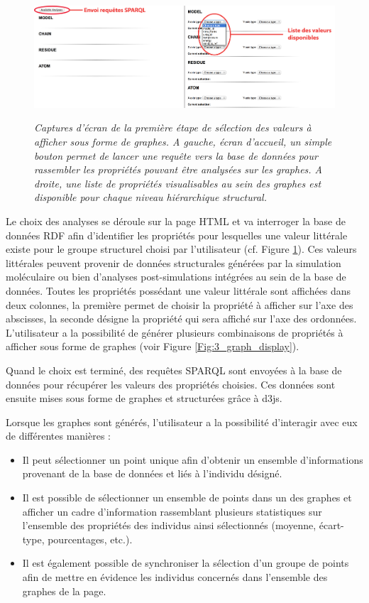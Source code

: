 \begin{figure}[htb]
  \centering
  {\includegraphics[width=0.9\linewidth,frame]{./figures/ch5/1st_step_annot_sep}}
    \caption[Première étape d'utilisation de notre plateforme.]{{\it Captures d'écran de la première étape de sélection des valeurs à afficher sous forme de graphes. A gauche, écran d'accueil, un simple bouton permet de lancer une requête vers la base de données pour rassembler les propriétés pouvant être analysées sur les graphes. A droite, une liste de propriétés visualisables au sein des graphes est disponible pour chaque niveau hiérarchique structural.}}
  \label{Fig:1st_step}
\end{figure}

Le choix des analyses se déroule sur la page HTML et va interroger la base de données RDF afin d'identifier les propriétés pour lesquelles une valeur littérale existe pour le groupe structurel choisi par l'utilisateur (cf. Figure \ref{Fig:1st_step}). 
Ces valeurs littérales peuvent provenir de données structurales générées par la simulation moléculaire ou bien d'analyses post-simulations intégrées au sein de la base de données. 
Toutes les propriétés possédant une valeur littérale sont affichées dans deux colonnes, la première permet de choisir la propriété à afficher sur l'axe des abscisses, la seconde désigne la propriété qui sera affiché sur l'axe des ordonnées. 
L'utilisateur a la possibilité de générer plusieurs combinaisons de propriétés à afficher sous forme de graphes (voir Figure \ref{Fig:3_graph_display}). 



Quand le choix est terminé, des requêtes SPARQL sont envoyées à la base de données pour récupérer les valeurs des propriétés choisies. Ces données sont ensuite mises sous forme de graphes et structurées grâce à d3js.

Lorsque les graphes sont générés, l'utilisateur a la possibilité d'interagir avec eux de différentes manières : 
\begin{itemize}
  \item Il peut sélectionner un point unique afin d'obtenir un ensemble d'informations provenant de la base de données et liés à l'individu désigné.
  \item Il est possible de sélectionner un ensemble de points dans un des graphes et afficher un cadre d'information rassemblant plusieurs statistiques sur l'ensemble des propriétés des individus ainsi sélectionnés (moyenne, écart-type, pourcentages, etc.).
  \item Il est également possible de synchroniser la sélection d'un groupe de points afin de mettre en évidence les individus concernés dans l'ensemble des graphes de la page.
\end{itemize}

